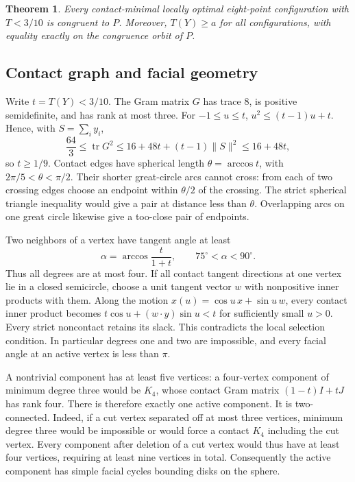 \documentclass[12pt,reqno]{amsart}
\newtheorem{theorem}{Theorem}[section]
\theoremstyle{definition}
\newcommand{\tr}{\operatorname{tr}}
\newcommand{\norm}[1]{\lVert#1\rVert}
\numberwithin{equation}{section}
\begin{document}
\begin{theorem}\label{r3:packingclassification}
Every contact-minimal locally optimal eight-point configuration with
$T<3/10$ is congruent to $P$. Moreover, $T(Y)\ge a$ for all configurations,
with equality exactly on the congruence orbit of $P$.
\end{theorem}

\subsection{Contact graph and facial geometry}
Write $t=T(Y)<3/10$. The Gram matrix $G$ has trace $8$, is positive
semidefinite, and has rank at most three. For $-1\le u\le t$,
$u^2\le(t-1)u+t$. Hence, with $S=\sum_i y_i$,
\[
 \frac{64}{3}\le\tr G^2\le16+48t+(t-1)\norm S^2\le16+48t,
\]
so $t\ge1/9$. Contact edges have spherical length $\theta=\arccos t$,
with $2\pi/5<\theta<\pi/2$. Their shorter great-circle arcs cannot cross:
from each of two crossing edges choose an endpoint within $\theta/2$ of
the crossing. The strict spherical triangle inequality would give a pair
at distance less than $\theta$. Overlapping arcs on one great circle
likewise give a too-close pair of endpoints.

Two neighbors of a vertex have tangent angle at least
\[
 \alpha=\arccos\frac{t}{1+t},\qquad 75^\circ<\alpha<90^\circ.
\]
Thus all degrees are at most four. If all contact tangent directions at
one vertex lie in a closed semicircle, choose a unit tangent vector $w$
with nonpositive inner products with them. Along the motion
$x(u)=\cos u\,x+\sin u\,w$, every contact inner product becomes
$t\cos u+(w\cdot y)\sin u<t$ for sufficiently small $u>0$.
Every strict noncontact retains its slack. This contradicts the local
selection condition. In particular degrees one and two are impossible,
and every facial angle at an active vertex is less than $\pi$.

A nontrivial component has at least five vertices: a four-vertex component
of minimum degree three would be $K_4$, whose contact Gram matrix
$(1-t)I+tJ$ has rank four. There is therefore exactly one active component.
It is two-connected. Indeed, if a cut vertex separated off at most three
vertices, minimum degree three would be impossible or would force a
contact $K_4$ including the cut vertex. Every component after deletion of
a cut vertex would thus have at least four vertices, requiring at least
nine vertices in total. Consequently the active component has simple
facial cycles bounding disks on the sphere.
\end{document}
